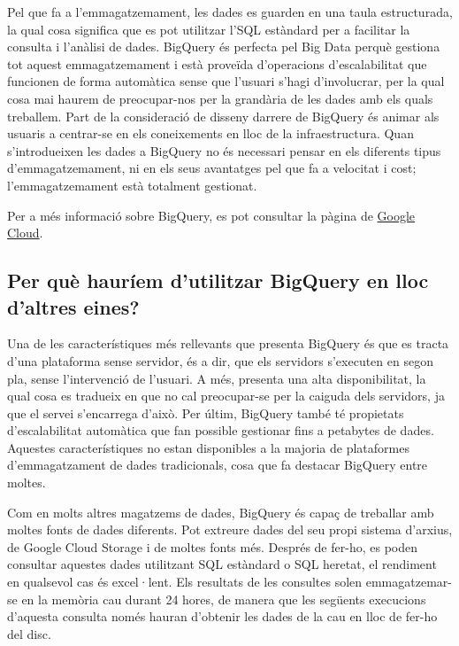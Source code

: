 \documentclass[12pt,longbibliography]{article}
\theoremstyle{definition}
\theoremstyle{remark}
\begin{document}
\vspace{2mm}

Pel que fa a l’emmagatzemament, les dades es guarden en una taula estructurada, la qual cosa significa que es pot utilitzar l’SQL estàndard per a facilitar la consulta i l’anàlisi de dades. BigQuery és perfecta pel Big Data perquè gestiona tot aquest emmagatzemament i està proveïda d’operacions d’escalabilitat que funcionen de forma automàtica sense que l’usuari s’hagi d’involucrar,  per la qual cosa mai haurem de preocupar-nos per la grandària de les dades amb els quals treballem. Part de la consideració de disseny darrere de BigQuery és animar als usuaris a centrar-se en els coneixements en lloc de la infraestructura. Quan s’introdueixen les dades a BigQuery no és necessari pensar en els diferents tipus d’emmagatzemament, ni en els seus avantatges pel que fa a velocitat i cost; l’emmagatzemament està totalment gestionat.

\vspace{2mm}
\noindent
Per a més informació sobre BigQuery, es pot consultar la pàgina de \href{https://cloud.google.com/bigquery/docs/introduction}{Google Cloud}.

\subsection{Per què hauríem d'utilitzar BigQuery en lloc d'altres eines?}

Una de les característiques més rellevants que presenta BigQuery és que es tracta d'una plataforma sense servidor, és a dir, que els servidors s'executen en segon pla, sense l'intervenció de l'usuari. A més, presenta una alta disponibilitat, la qual cosa es tradueix en que no cal preocupar-se per la caiguda dels servidors, ja que el servei s'encarrega d'això. Per últim, BigQuery també té propietats d'escalabilitat automàtica que fan possible gestionar fins a petabytes de dades. Aquestes característiques no estan disponibles a la majoria de plataformes d'emmagatzament de dades tradicionals, cosa que fa destacar BigQuery entre moltes.

\vspace{2mm}

Com en molts altres magatzems de dades, BigQuery és capaç de treballar amb moltes fonts de dades diferents. Pot extreure dades del seu propi sistema d'arxius, de Google Cloud Storage i de moltes fonts més. Després de fer-ho, es poden consultar aquestes dades utilitzant SQL estàndard o SQL heretat, el rendiment en qualsevol cas és excel·lent. Els resultats de les consultes solen emmagatzemar-se en la memòria cau durant 24 hores, de manera que les següents execucions d'aquesta consulta només hauran d'obtenir les dades de la cau en lloc de fer-ho del disc. 
\end{document}

